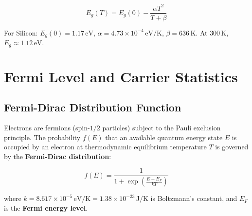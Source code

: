 \documentclass[12pt,a4paper]{article}
\begin{document}
\begin{equation}
  E_g(T) = E_g(0) - \frac{\alpha T^2}{T + \beta}
\end{equation}

For Silicon: $E_g(0) = 1.17\,\text{eV}$, $\alpha = 4.73 \times 10^{-4}\,\text{eV/K}$, $\beta = 636\,\text{K}$. At $300\,\text{K}$, $E_g \approx 1.12\,\text{eV}$.

\section{Fermi Level and Carrier Statistics}

\subsection{Fermi-Dirac Distribution Function}
Electrons are fermions (spin-$1/2$ particles) subject to the Pauli exclusion principle. The probability $f(E)$ that an available quantum energy state $E$ is occupied by an electron at thermodynamic equilibrium temperature $T$ is governed by the \textbf{Fermi-Dirac distribution}:

\begin{equation}
  f(E) = \frac{1}{1 + \exp\left(\displaystyle\frac{E - E_F}{k T}\right)}
\end{equation}

where $k = 8.617 \times 10^{-5}\,\text{eV/K} = 1.38 \times 10^{-23}\,\text{J/K}$ is Boltzmann's constant, and $E_F$ is the \textbf{Fermi energy level}.
\end{document}
